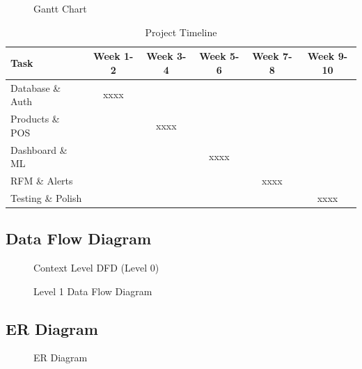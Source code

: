\documentclass[12pt,a4paper]{report}
\begin{document}
\begin{figure}[H]
    \centering
    
    \caption{Gantt Chart}
\end{figure}

\begin{table}[H]
\centering
\begin{tabular}{|l|c|c|c|c|c|}
\hline
\textbf{Task} & \textbf{Week 1-2} & \textbf{Week 3-4} & \textbf{Week 5-6} & \textbf{Week 7-8} & \textbf{Week 9-10} \\
\hline
Database \& Auth & xxxx & & & & \\
\hline
Products \& POS & & xxxx & & & \\
\hline
Dashboard \& ML & & & xxxx & & \\
\hline
RFM \& Alerts & & & & xxxx & \\
\hline
Testing \& Polish & & & & & xxxx \\
\hline
\end{tabular}
\caption{Project Timeline}
\end{table}

\subsection{Data Flow Diagram}

\begin{figure}[H]
    \centering
    
    \caption{Context Level DFD (Level 0)}
\end{figure}

\begin{figure}[H]
    \centering
    
    \caption{Level 1 Data Flow Diagram}
\end{figure}

\subsection{ER Diagram}

\begin{figure}[H]
    \centering
    
    \caption{ER Diagram}
\end{figure}
\end{document}
